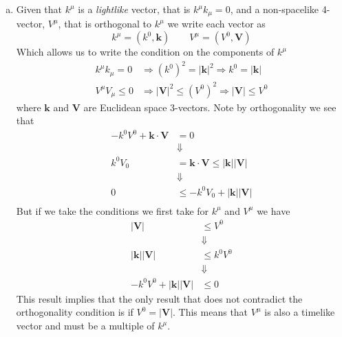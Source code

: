 \documentclass[11pt]{article}
\numberwithin{equation}{section}
\begin{document}
\begin{enumerate}[(a)]
\item
    Given that $k^{\mu}$ is a \emph{lightlike} vector, that is $k^{\mu}k_{\mu} = 0$, and a non-spacelike 
    4-vector, $V^{\mu}$, that is orthogonal to $k^{\mu}$ we write each vector as
    $$k^{\mu} = (k^0,\mathbf{k})\qquad V^{\mu} = (V^0,\mathbf{V})$$
    Which allows us to write the condition on the components of $k^{\mu}$
    \begin{align*}
        k^{\mu}k_{\mu} = 0 &\Rightarrow (k^0)^2 = |\mathbf{k}|^2 \Rightarrow k^0 = |\mathbf{k}|\\
        V^{\mu}V_{\mu} \le 0 &\Rightarrow |\mathbf{V}|^2 \le (V^0)^2\Rightarrow |\mathbf{V}| \le V^0
    \end{align*}
    where $\mathbf{k}$ and $\mathbf{V}$ are Euclidean space 3-vectors. Note by orthogonality we see that
    \begin{align*}
        -k^0V^0 + \mathbf{k}\cdot\mathbf{V} &= 0\\
        &\Downarrow\\
        k^0V_0 &= \mathbf{k}\cdot\mathbf{V} \le |\mathbf{k}||\mathbf{V}|\\
        &\Downarrow\\
        0 &\le - k^0V_0 + |\mathbf{k}||\mathbf{V}|\\
    \end{align*}
    But if we take the conditions we first take for $k^{\mu}$ and $V^{\mu}$ we have
    \begin{align*}
        |\mathbf{V}| &\le V^{0} \\
        &\Downarrow\\
        |\mathbf{k}||\mathbf{V}| &\le k^0V^{0}\\
        &\Downarrow\\
        -k^0V^0 + |\mathbf{k}||\mathbf{V}| &\le 0
    \end{align*}
    This result implies that the only result that does not contradict the orthogonality condition is if 
    $V^{0} = |\mathbf{V}|$. This means that $V^{\mu}$ is also a timelike vector and must be a multiple of $k^{\mu}$.

\end{enumerate}

\pagebreak
\end{document}
